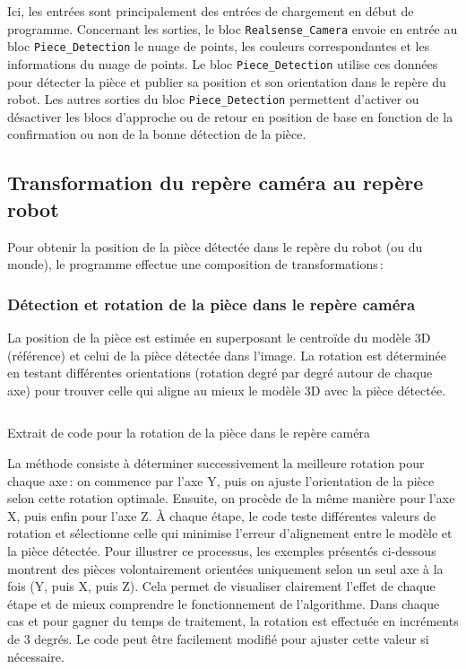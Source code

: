 Ici, les entrées sont principalement des entrées de chargement en début de programme. Concernant les sorties, le bloc \texttt{Realsense\_Camera} envoie en entrée au bloc \texttt{Piece\_Detection} le nuage de points, les couleurs correspondantes et les informations du nuage de points. Le bloc \texttt{Piece\_Detection} utilise ces données pour détecter la pièce et publier sa position et son orientation dans le repère du robot. Les autres sorties du bloc \texttt{Piece\_Detection} permettent d'activer ou désactiver les blocs d'approche ou de retour en position de base en fonction de la confirmation ou non de la bonne détection de la pièce.

\subsection{Transformation du repère caméra au repère robot}

\sloppy

Pour obtenir la position de la pièce détectée dans le repère du robot (ou du monde), le programme effectue une composition de transformations :

\subsubsection{Détection et rotation de la pièce dans le repère caméra}

La position de la pièce est estimée en superposant le centroïde du modèle 3D (référence) et celui de la pièce détectée dans l'image. La rotation est déterminée en testant différentes orientations (rotation degré par degré autour de chaque axe) pour trouver celle qui aligne au mieux le modèle 3D avec la pièce détectée.

\setlength{\belowcaptionskip}{0pt}
\begin{listing}[H]
    \inputminted{python}{assets/code/rotation.py}
    \caption{Extrait de code pour la rotation de la pièce dans le repère caméra}
\end{listing}

La méthode consiste à déterminer successivement la meilleure rotation pour chaque axe : on commence par l’axe Y, puis on ajuste l’orientation de la pièce selon cette rotation optimale. Ensuite, on procède de la même manière pour l’axe X, puis enfin pour l’axe Z. À chaque étape, le code teste différentes valeurs de rotation et sélectionne celle qui minimise l’erreur d’alignement entre le modèle et la pièce détectée.
Pour illustrer ce processus, les exemples présentés ci-dessous montrent des pièces volontairement orientées uniquement selon un seul axe à la fois (Y, puis X, puis Z). Cela permet de visualiser clairement l’effet de chaque étape et de mieux comprendre le fonctionnement de l’algorithme. Dans chaque cas et pour gagner du temps de traitement, la rotation est effectuée en incréments de 3 degrés. Le code peut être facilement modifié pour ajuster cette valeur si nécessaire.

